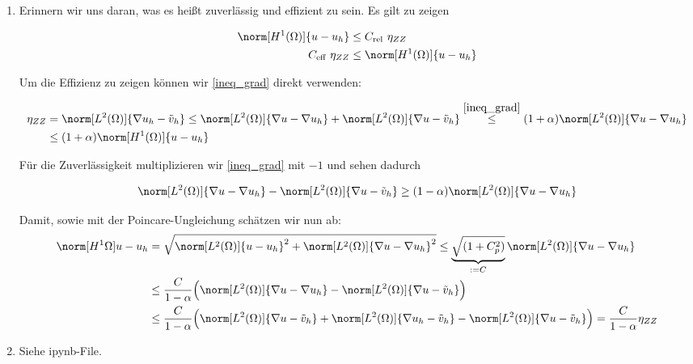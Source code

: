 
\begin{solution}

\begin{enumerate}[label = \textbf{\alph*)}]
  \item Erinnern wir uns daran, was es heißt zuverlässig und effizient zu sein. Es gilt zu zeigen

  \begin{align*}
    \norm[H^1(\Omega)]{u - u_h} &\leq C_{\text{rel}}~ \eta_{ZZ} \\
    C_{\text{eff}}~ \eta_{ZZ} &\leq \norm[H^1(\Omega)]{u - u_h}
  \end{align*}

  Um die Effizienz zu zeigen können wir \ref{ineq_grad} direkt verwenden:

  \begin{align*}
    \eta_{ZZ}
    &=
    \norm[L^2(\Omega)]{\nabla u_h - \tilde{v}_h}
    \leq
    \norm[L^2(\Omega)]{\nabla u - \nabla u_h} + \norm[L^2(\Omega)]{\nabla u - \tilde{v}_h}
    \stackrel{\ref{ineq_grad}}{\leq}
    (1 + \alpha) \norm[L^2(\Omega)]{\nabla u - \nabla u_h} \\
    &\leq
    (1 + \alpha) \norm[H^1(\Omega)]{u - u_h}
  \end{align*}

  Für die Zuverlässigkeit multiplizieren wir \ref{ineq_grad} mit $-1$ und sehen dadurch

  \begin{align*}
    \norm[L^2(\Omega)]{\nabla u - \nabla u_h} - \norm[L^2(\Omega)]{\nabla u - \tilde{v}_h}
    \geq
    (1 - \alpha) \norm[L^2(\Omega)]{\nabla u - \nabla u_h}
  \end{align*}

  Damit, sowie mit der Poincare-Ungleichung schätzen wir nun ab:
  \begin{align*}
    \norm[H^1{\Omega}]{u - u_h}
    &=
    \sqrt{\norm[L^2(\Omega)]{u - u_h}^2 + \norm[L^2(\Omega)]{\nabla u - \nabla u_h}^2}
    \leq
    \underbrace{\sqrt{(1+C_p^2)}}_{:=C} \norm[L^2(\Omega)]{\nabla u - \nabla u_h} \\
    &\leq
    \frac{C}{1-\alpha} \Big(
      \norm[L^2(\Omega)]{\nabla u - \nabla u_h} - \norm[L^2(\Omega)]{\nabla u - \tilde{v}_h}
    \Big) \\
    &\leq
    \frac{C}{1-\alpha} \Big(
      \norm[L^2(\Omega)]{\nabla u - \tilde{v}_h} + \norm[L^2(\Omega)]{\nabla u_h - \tilde{v}_h} - \norm[L^2(\Omega)]{\nabla u - \tilde{v}_h}
      \Big)
    =
    \frac{C}{1-\alpha} \eta_{ZZ}
  \end{align*}

  \item Siehe ipynb-File.
\end{enumerate}

\end{solution}

